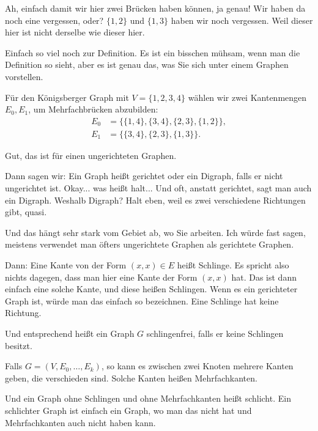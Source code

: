 \begin{spoken-clean}[00:21:12 - 00:22:55]
Ah, einfach damit wir hier zwei Brücken haben können, ja genau! Wir haben da noch eine vergessen, oder?  $\{1, 2\}$ und $\{1, 3\}$ haben wir noch vergessen. Weil dieser hier ist nicht derselbe wie dieser hier.

Einfach so viel noch zur Definition. Es ist ein bisschen mühsam, wenn man die Definition so sieht, aber es ist genau das, was Sie sich unter einem Graphen vorstellen.
\end{spoken-clean}

\begin{math-stroke}
Für den Königsberger Graph mit $V = \{1, 2, 3, 4\}$ wählen wir zwei Kantenmengen $E_0, E_1$, um Mehrfachbrücken abzubilden:
\begin{align*}
E_0 &= \bigl\{ \{1, 4\}, \{3, 4\}, \{2, 3\}, \{1, 2\} \bigr\}, \\
E_1 &= \bigl\{ \{3, 4\}, \{2, 3\}, \{1, 3\} \bigr\}.
\end{align*}
\end{math-stroke}

\begin{spoken-clean}[00:22:55 - 00:25:32]
Gut, das ist für einen ungerichteten Graphen.

Dann sagen wir: Ein Graph heißt gerichtet oder ein Digraph, falls er nicht ungerichtet ist. Okay... was heißt  halt... Und oft, anstatt gerichtet, sagt man auch ein Digraph. Weshalb Digraph? Halt eben, weil es zwei verschiedene Richtungen gibt, quasi.

Und das hängt sehr stark vom Gebiet ab, wo Sie arbeiten. Ich würde fast sagen, meistens verwendet man öfters ungerichtete Graphen als gerichtete Graphen.

Dann: Eine Kante von der Form $(x, x) \in E$ heißt Schlinge. Es spricht also nichts dagegen, dass man hier eine Kante der Form $(x, x)$ hat. Das ist dann einfach eine solche Kante, und diese heißen Schlingen. Wenn es ein gerichteter Graph ist, würde man das einfach so bezeichnen. Eine Schlinge hat keine Richtung.

Und entsprechend heißt ein Graph $G$ schlingenfrei, falls er keine Schlingen besitzt.

Falls $G = (V, E_0, \dots, E_k)$, so kann es zwischen zwei Knoten mehrere Kanten geben, die verschieden sind. Solche Kanten heißen Mehrfachkanten.

Und ein Graph ohne Schlingen und ohne Mehrfachkanten heißt schlicht. Ein schlichter Graph ist einfach ein Graph, wo man das nicht hat und Mehrfachkanten auch nicht haben kann.
\end{spoken-clean}

